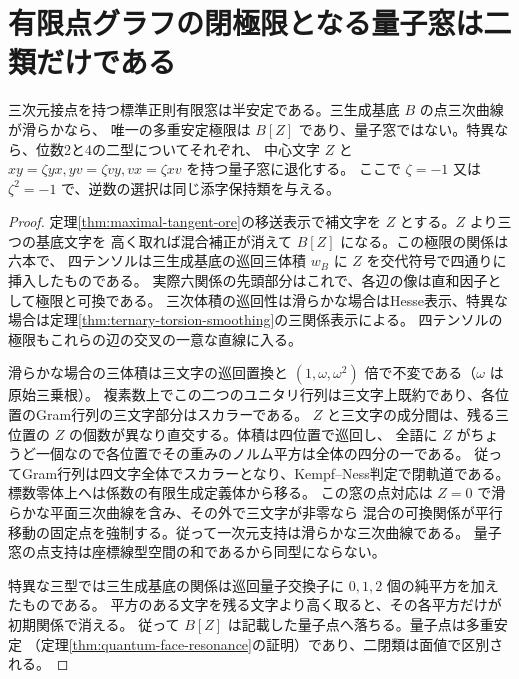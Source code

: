 \section{有限点グラフの閉極限となる量子窓は二類だけである}
\label{sec:finite-quantum-closed-limits}
\begin{proposition}\label{prop:maximal-tangent-closed-limits}
三次元接点を持つ標準正則有限窓は半安定である。三生成基底 $B$ の点三次曲線が滑らかなら、
唯一の多重安定極限は $B[Z]$ であり、量子窓ではない。特異なら、位数2と4の二型についてそれぞれ、
中心文字 $Z$ と $xy=\zeta yx,yv=\zeta vy,vx=\zeta xv$ を持つ量子窓に退化する。
ここで $\zeta=-1$ 又は $\zeta^2=-1$ で、逆数の選択は同じ添字保持類を与える。
\end{proposition}
\begin{proof}
定理\ref{thm:maximal-tangent-ore}の移送表示で補文字を $Z$ とする。$Z$ より三つの基底文字を
高く取れば混合補正が消えて $B[Z]$ になる。この極限の関係は六本で、
四テンソルは三生成基底の巡回三体積 $w_B$ に $Z$ を交代符号で四通りに挿入したものである。
実際六関係の先頭部分はこれで、各辺の像は直和因子として極限と可換である。
三次体積の巡回性は滑らかな場合はHesse表示、特異な場合は定理\ref{thm:ternary-torsion-smoothing}の三関係表示による。
四テンソルの極限もこれらの辺の交叉の一意な直線に入る。

滑らかな場合の三体積は三文字の巡回置換と $(1,\omega,\omega^2)$ 倍で不変である（$\omega$ は原始三乗根）。
複素数上でこの二つのユニタリ行列は三文字上既約であり、各位置のGram行列の三文字部分はスカラーである。
$Z$ と三文字の成分間は、残る三位置の $Z$ の個数が異なり直交する。体積は四位置で巡回し、
全語に $Z$ がちょうど一個なので各位置でその重みのノルム平方は全体の四分の一である。
従ってGram行列は四文字全体でスカラーとなり、Kempf--Ness判定で閉軌道である。
標数零体上へは係数の有限生成定義体から移る。
この窓の点対応は $Z=0$ で滑らかな平面三次曲線を含み、その外で三文字が非零なら
混合の可換関係が平行移動の固定点を強制する。従って一次元支持は滑らかな三次曲線である。
量子窓の点支持は座標線型空間の和であるから同型にならない。

特異な三型では三生成基底の関係は巡回量子交換子に $0,1,2$ 個の純平方を加えたものである。
平方のある文字を残る文字より高く取ると、その各平方だけが初期関係で消える。
従って $B[Z]$ は記載した量子点へ落ちる。量子点は多重安定
（定理\ref{thm:quantum-face-resonance}の証明）であり、二閉類は面値で区別される。
\end{proof}


